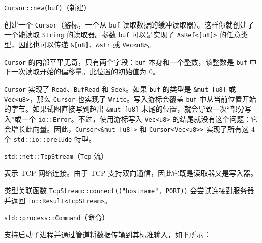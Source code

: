\begin{mySidenote}
\texttt{Cursor::new(buf)}（新建）
\end{mySidenote}

创建一个 \texttt{Cursor}（游标，一个从 \texttt{buf} 读取数据的缓冲读取器）。这样你就创建了一个能读取 \texttt{String} 的读取器。参数 \texttt{buf} 可以是实现了 \texttt{AsRef<[u8]>} 的任意类型，因此也可以传递 \texttt{\&[u8]}、\texttt{\&str} 或 \texttt{Vec<u8>}。

\texttt{Cursor} 的内部平平无奇，只有两个字段：\texttt{buf} 本身和一个整数，该整数是 \texttt{buf} 中下一次读取开始的偏移量。此位置的初始值为 0。

\texttt{Cursor} 实现了 \texttt{Read}、\texttt{BufRead} 和 \texttt{Seek}。如果 \texttt{buf} 的类型是 \texttt{\&mut [u8]} 或 \texttt{Vec<u8>}，那么 \texttt{Cursor} 也实现了 \texttt{Write}。写入游标会覆盖 \texttt{buf} 中从当前位置开始的字节。如果试图直接写到超出 \texttt{\&mut [u8]} 末尾的位置，就会导致一次“部分写入”或一个 \texttt{io::Error}。不过，使用游标写入 \texttt{Vec<u8>} 的结尾就没有这个问题：它会增长此向量。因此，\texttt{Cursor<\&mut [u8]>} 和 \texttt{Cursor<Vec<u8>>} 实现了所有这 4 个 \texttt{std::io::prelude} 特型。

\begin{mySidenote}
\texttt{std::net::TcpStream}（\texttt{Tcp} 流）
\end{mySidenote}

表示 TCP 网络连接。由于 TCP 支持双向通信，因此它既是读取器又是写入器。

类型关联函数 \texttt{TcpStream::connect(("hostname", PORT))} 会尝试连接到服务器并返回 \texttt{io::Result<TcpStream>}。

\begin{mySidenote}
\texttt{std::process::Command}（命令）
\end{mySidenote}

支持启动子进程并通过管道将数据传输到其标准输入，如下所示：

